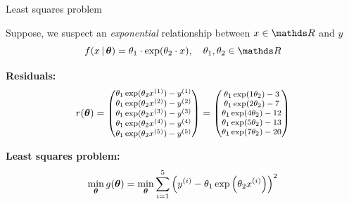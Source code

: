 \documentclass[11pt,compress,t,notes=noshow, xcolor=table]{beamer}
\begin{document}
\begin{vbframe}{Least squares problem}
\framebreak

Suppose, we suspect an \textit{exponential} relationship between $x \in \R$ and $y$ 
\begin{equation*}
    f(x \,|\, \thetab) = \theta_1 \cdot \exp(\theta_2 \cdot x), \quad \theta_1, \theta_2 \in \R
\end{equation*}




\textbf{Residuals:}
\begin{equation*}
    \footnotesize
    r(\bm{\theta}) = \begin{pmatrix} 
        \theta_1 \exp(\theta_2 x^{(1)}) - y^{(1)} \\
        \theta_1 \exp(\theta_2 x^{(2)}) - y^{(2)} \\
        \theta_1 \exp(\theta_2 x^{(3)}) - y^{(3)} \\
        \theta_1 \exp(\theta_2 x^{(4)}) - y^{(4)} \\
        \theta_1 \exp(\theta_2 x^{(5)}) - y^{(5)}
     \end{pmatrix} = \begin{pmatrix} 
        \theta_1 \exp(1 \theta_2) - 3 \\
        \theta_1 \exp(2 \theta_2) - 7 \\
        \theta_1 \exp(4 \theta_2) - 12 \\
        \theta_1 \exp(5 \theta_2) - 13 \\
        \theta_1 \exp(7 \theta_2) - 20
     \end{pmatrix}
\end{equation*}

\textbf{Least squares problem:}
\begin{equation*}
    \min_{\bm{\theta}} g(\bm{\theta}) = \min_{\bm{\theta}} \sum_{i=1}^{5} \left(y^{(i)} - \theta_1 \exp\left(\theta_2 x^{(i)}\right)\right)^2
\end{equation*}

\end{vbframe}
\end{document}
